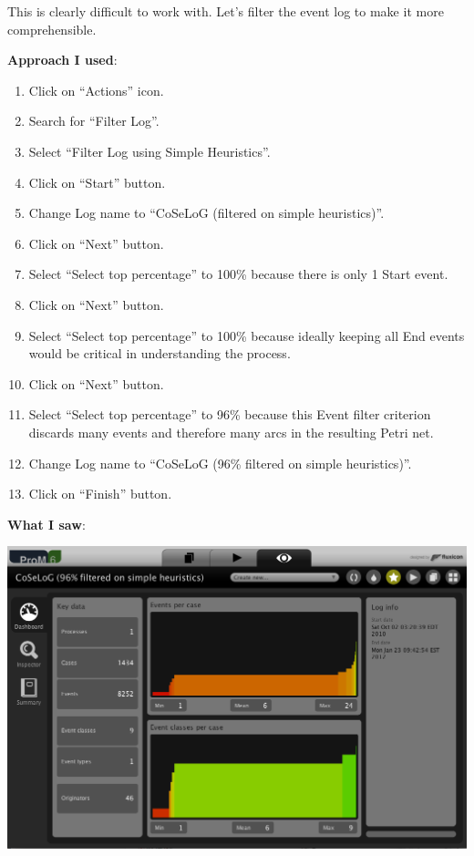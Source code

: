 \documentclass[]{article}
\begin{document}
This is clearly difficult to work with. Let's filter the event log to
make it more comprehensible.

\textbf{Approach I used}:

\begin{enumerate}
\def\labelenumi{\arabic{enumi}.}
\setcounter{enumi}{5}
\itemsep1pt\parskip0pt
\item
  Click on ``Actions'' icon.\\
\item
  Search for ``Filter Log''.\\
\item
  Select ``Filter Log using Simple Heuristics''.\\
\item
  Click on ``Start'' button.
\item
  Change Log name to ``CoSeLoG (filtered on simple heuristics)''.\\
\item
  Click on ``Next'' button.
\item
  Select ``Select top percentage'' to 100\% because there is only 1
  Start event.
\item
  Click on ``Next'' button.
\item
  Select ``Select top percentage'' to 100\% because ideally keeping all
  End events would be critical in understanding the process.\\
\item
  Click on ``Next'' button.
\item
  Select ``Select top percentage'' to 96\% because this Event filter
  criterion discards many events and therefore many arcs in the
  resulting Petri net.
\item
  Change Log name to ``CoSeLoG (96\% filtered on simple heuristics)''.\\
\item
  Click on ``Finish'' button.
\end{enumerate}

\textbf{What I saw}:

\includegraphics{CoSeLoG_Step_05_Filter96.png}
\end{document}
